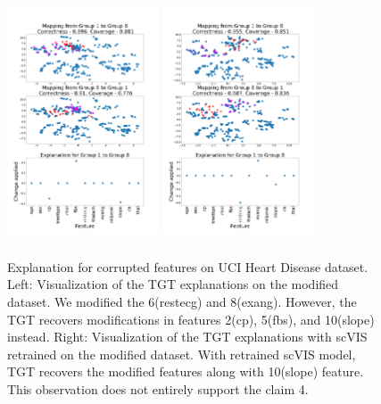 \begin{figure}[H]
    \centering
    \includegraphics[width=0.4\textwidth, height=7.2cm]{images/tffigures/heart-t2c.png}
    \includegraphics[width=0.4\textwidth, height=7.2cm]{images/tffigures/heart-retrained-t2c.png}
    \caption{Explanation for corrupted features on UCI Heart Disease dataset. Left: Visualization of the TGT explanations on the modified dataset. We modified the 6(restecg) and 8(exang). However, the TGT recovers modifications in features 2(cp), 5(fbs), and 10(slope) instead. Right: Visualization of the TGT explanations with scVIS retrained on the modified dataset. With retrained scVIS model, TGT recovers the modified features along with 10(slope) feature. This observation does not entirely support the claim 4.}
    \label{fig:t2c-Heart}
\end{figure}
